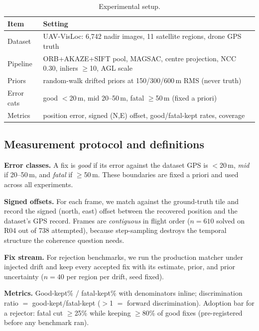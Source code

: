 \documentclass[journal]{IEEEtran}
\begin{document}
\begin{table}[t]
\caption{Experimental setup.}
\label{tab:setup}
\centering
\footnotesize
\begin{tabular}{@{}l>{\raggedright\arraybackslash}p{2.55in}@{}}
\toprule
Item & Setting \\
\midrule
Dataset & UAV-VisLoc: 6,742 nadir images, 11 satellite regions, drone GPS truth \\
Pipeline & ORB+AKAZE+SIFT pool, MAGSAC, centre projection, NCC 0.30, inliers $\geq$10, AGL scale \\
Priors & random-walk drifted priors at 150/300/600\,m RMS (never truth) \\
Error cats & good $<$20\,m, mid 20--50\,m, fatal $\geq$50\,m (fixed a priori) \\
Metrics & position error, signed (N,E) offset, good/fatal-kept rates, coverage \\
\bottomrule
\end{tabular}
\end{table}


\subsection{Measurement protocol and definitions}
\textbf{Error classes.} A fix is \emph{good} if its error against the dataset GPS is $<$20\,m, \emph{mid} if 20--50\,m, and \emph{fatal} if $\geq$50\,m. These boundaries are fixed a priori and used across all experiments.

\textbf{Signed offsets.} For each frame, we match against the ground-truth tile and record the signed (north, east) offset between the recovered position and the dataset's GPS record. Frames are \emph{contiguous} in flight order ($n=610$ solved on R04 out of 738 attempted), because step-sampling destroys the temporal structure the coherence question needs.

\textbf{Fix stream.} For rejection benchmarks, we run the production matcher under injected drift and keep every accepted fix with its estimate, prior, and prior uncertainty ($n=40$ per region per drift, seed fixed).

\textbf{Metrics.} Good-kept\% / fatal-kept\% with denominators inline; discrimination ratio $=$ good-kept/fatal-kept ($>$1 $=$ forward discrimination). Adoption bar for a rejector: fatal cut $\geq$25\% while keeping $\geq$80\% of good fixes (pre-registered before any benchmark ran).
\end{document}
